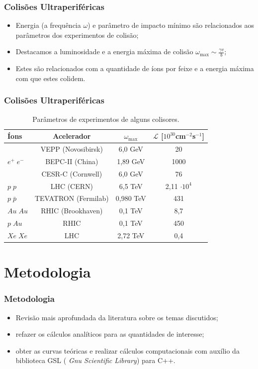 \documentclass[xcolor=dvipsnames]{beamer}
\begin{document}
\begin{frame}
	\frametitle{Colisões Ultraperiféricas}
	\begin{itemize}
		\item Energia (a frequência $\omega$) e parâmetro de impacto mínimo
			são relacionados aos parâmetros dos experimentos de colisão;
		\item Destacamos a luminosidade e a energia máxima de colisão
			$\displaystyle \omega _\text{max} \sim \frac{\gamma v}{b}$;
		\item Estes são relacionados com a quantidade de íons por feixe e a
			energia máxima com que estes colidem.
	\end{itemize}
\end{frame}

\begin{frame}
	\frametitle{Colisões Ultraperiféricas}
	
	\begin{table}
		\begin{tabular}{lccc}
			\hline
			Íons & Acelerador & $\omega _\text{max}$ & $\mathcal{L}$
				[$10^{30}$cm$^{-2}$s$^{-1}$]\\
			\hline
			\multirow{3}{4em}{$e^+ \; e^-$} & VEPP (Novosibirsk) & 6,0 GeV & 20
			\\
			& BEPC-II (China) & 1,89 GeV & 1000 \\
			& CESR-C (Cornwell) & 6,0 GeV & 76 \\
			$p \; p$ & LHC (CERN) & 6,5 TeV & 2,11 $\cdot 10^{4}$ \\
			$p \; \bar{p}$ & TEVATRON (Fermilab) & 0,980 TeV & 431 \\
			$Au \; Au$ & RHIC (Brookhaven) & 0,1 TeV & 8,7 \\
			$p \; Au$ & RHIC & 0,1 TeV & 450 \\
			$Xe \; Xe$ & LHC & 2,72 TeV & 0,4 \\
			\hline
		\end{tabular}
		\caption{Parâmetros de experimentos de alguns colisores.}
	\end{table}
\end{frame}

\section{Metodologia}
\begin{frame}
	\frametitle{Metodologia}
	\begin{itemize}
		\item Revisão mais aprofundada da literatura sobre os temas discutidos;
		\item refazer os cálculos analíticos para as quantidades de interesse;
		\item obter as curvas teóricas e realizar cálculos computacionais com
			auxílio da biblioteca GSL (\textit{ Gnu Scientific Library}) para
			C++.
	\end{itemize}
\end{frame}
\end{document}

